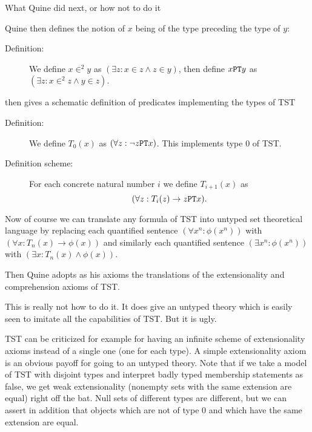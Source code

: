 \documentclass{slides}
\begin{document}
\begin{slide}

{\Large What Quine did next, or how not to do it}

Quine then defines the notion of $x$ being of the type preceding the type of $y$:

\begin{description}

\item[Definition:]  We define $x \in^2 y$ as \newline $(\exists z:x \in z \wedge z \in y)$, then define $x {\tt PT} y$ as $(\exists z:x \in^2 z \wedge y \in z)$.  

\end{description}

then gives a schematic definition of predicates implementing the types of TST

\begin{description}

\item[Definition:]  We define $T_0(x)$ as $(\forall z:\neg z{\tt PT}x)$.  This implements type 0 of TST.

\item[Definition scheme:]  For each concrete natural number $i$ we define $T_{i+1}(x)$ as $$(\forall z:T_i(z) \rightarrow z {\tt PT} x).$$

\end{description}

\end{slide}

\begin{slide}


Now of course we can translate any formula of TST into untyped set theoretical language by replacing each quantified sentence \newline $(\forall x^n:\phi(x^n))$ with
$(\forall x:T_n(x) \rightarrow \phi(x))$ and similarly each quantified sentence $(\exists x^n:\phi(x^n))$ with
$(\exists x:T_n(x) \wedge \phi(x))$.

Then Quine adopts as his axioms the translations of the extensionality and comprehension axioms of TST.


\end{slide}

\begin{slide}

This is really not how to do it.  It does give an untyped theory which is easily seen to imitate all the capabilities of TST.  But it is ugly.

TST can be criticized for example for having an infinite scheme of extensionality axioms instead of a single one (one for each type).  A simple extensionality axiom is an obvious payoff for going to an untyped theory.  Note that if we take a model of TST with disjoint types and interpret badly typed membership statements
as false, we get weak extensionality (nonempty sets with the same extension are equal) right off the bat.  Null sets of different types are different, but we can assert in addition that objects which are not of type 0 and which have the same extension are equal.

\end{slide}
\end{document}
